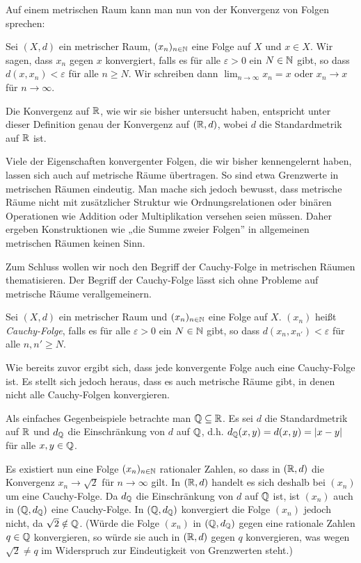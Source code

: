 \documentclass[a4paper,10pt]{article}
\begin{document}
Auf einem metrischen Raum kann man nun von der Konvergenz von Folgen sprechen:


\begin{defi}
 Sei $(X,d)$ ein metrischer Raum, $(x_n)_{n \in \mathbb{N}}$ eine Folge auf $X$ und $x \in X$. Wir sagen, dass $x_n$ gegen $x$ konvergiert, falls es für alle $\varepsilon > 0$ ein $N \in \mathbb{N}$ gibt, so dass $d(x, x_n) < \varepsilon$ für alle $n \geq N$. Wir schreiben dann $\lim_{n \to \infty} x_n = x$ oder $x_n \to x$ für $n \to \infty$.
\end{defi}


Die Konvergenz auf $\mathbb{R}$, wie wir sie bisher untersucht haben, entspricht unter dieser Definition genau der Konvergenz auf $(\mathbb{R},d)$, wobei $d$ die Standardmetrik auf $\mathbb{R}$ ist.


Viele der Eigenschaften konvergenter Folgen, die wir bisher kennengelernt haben, lassen sich auch auf metrische Räume übertragen. So sind etwa Grenzwerte in metrischen Räumen eindeutig. Man mache sich jedoch bewusst, dass metrische Räume nicht mit zusätzlicher Struktur wie Ordnungsrelationen oder binären Operationen wie Addition oder Multiplikation versehen seien müssen. Daher ergeben  Konstruktionen wie „die Summe zweier Folgen” in allgemeinen metrischen Räumen keinen Sinn.


Zum Schluss wollen wir noch den Begriff der Cauchy-Folge in metrischen Räumen thematisieren. Der Begriff der Cauchy-Folge lässt sich ohne Probleme auf metrische Räume verallgemeinern.

\begin{defi}
 Sei $(X,d)$ ein metrischer Raum und $(x_n)_{n \in \mathbb{N}}$ eine Folge auf $X$. $(x_n)$ heißt \emph{Cauchy-Folge}, falls es für alle $\varepsilon > 0$ ein $N \in \mathbb{N}$ gibt, so dass $d(x_n, x_{n'}) < \varepsilon$ für alle $n, n' \geq N$.
\end{defi}

Wie bereits zuvor ergibt sich, dass jede konvergente Folge auch eine Cauchy-Folge ist. Es stellt sich jedoch heraus, dass es auch metrische Räume gibt, in denen nicht alle Cauchy-Folgen konvergieren.

Als einfaches Gegenbeispiele betrachte man $\mathbb{Q} \subseteq \mathbb{R}$. Es sei $d$ die Standardmetrik auf $\mathbb{R}$ und $d_{\mathbb{Q}}$ die Einschränkung von $d$ auf $\mathbb{Q}$, d.h. $d_{\mathbb{Q}}(x,y) = d(x,y) = |x-y|$ für alle $x,y \in \mathbb{Q}$.

Es existiert nun eine Folge $(x_n)_{n \in \mathbb{N}}$ rationaler Zahlen, so dass in $(\mathbb{R}, d)$ die Konvergenz $x_n \to \sqrt{2}$ für $n \to \infty$ gilt. In $(\mathbb{R}, d)$ handelt es sich deshalb bei $(x_n)$ um eine Cauchy-Folge. Da $d_{\mathbb{Q}}$ die Einschränkung von $d$ auf $\mathbb{Q}$ ist, ist $(x_n)$ auch in $(\mathbb{Q},d_{\mathbb{Q}})$ eine Cauchy-Folge. In $(\mathbb{Q},d_{\mathbb{Q}})$ konvergiert die Folge $(x_n)$ jedoch nicht, da $\sqrt{2} \notin \mathbb{Q}$. (Würde die Folge $(x_n)$ in $(\mathbb{Q}, d_{\mathbb{Q}})$ gegen eine rationale Zahlen $q \in \mathbb{Q}$ konvergieren, so würde sie auch in $(\mathbb{R}, d)$ gegen $q$ konvergieren, was wegen $\sqrt{2} \neq q$ im Widerspruch zur Eindeutigkeit von Grenzwerten steht.)
\end{document}
